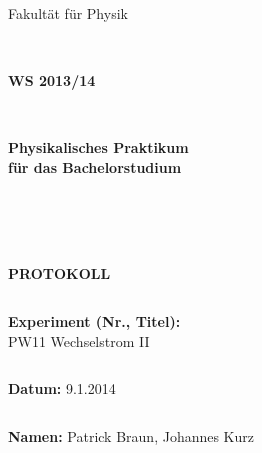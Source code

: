 \documentclass[12pt,a4paper]{article}
\begin{document}
\thispagestyle{empty}
			\begin{center}
			\Large{Fakultät für Physik}\\
			\end{center}
\begin{verbatim}


\end{verbatim}
			\begin{center}
			\textbf{\LARGE WS 2013/14}
			\end{center}
\begin{verbatim}


\end{verbatim}
			\begin{center}
			\textbf{\LARGE{Physikalisches Praktikum\\ für das Bachelorstudium}}
			\end{center}
\begin{verbatim}




\end{verbatim}

			\begin{center}
			\textbf{\LARGE{PROTOKOLL}}
			\end{center}
			
\begin{verbatim}

\end{verbatim}

			\begin{flushleft}
			\textbf{\Large{Experiment (Nr., Titel):}}\\
			\LARGE{PW11 Wechselstrom II}	
			\end{flushleft}

\begin{verbatim}

\end{verbatim}	
			\begin{flushleft}
			\textbf{\Large{Datum:}} \Large{9.1.2014}
			\end{flushleft}
			
\begin{verbatim}
\end{verbatim}
		\begin{flushleft}
			\textbf{\Large{Namen:}} \Large{Patrick Braun, Johannes Kurz}
			\end{flushleft}
\end{document}
